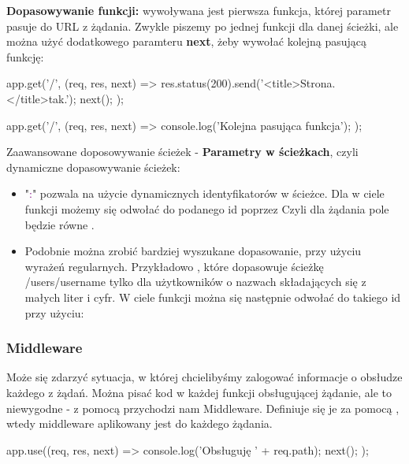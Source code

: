 \textbf{Dopasowywanie funkcji:} wywoływana jest pierwsza funkcja, której parametr pasuje do URL z żądania. Zwykle piszemy po jednej funkcji dla danej ścieżki, ale można użyć dodatkowego paramteru \textbf{next}, żeby wywołać kolejną pasującą funkcję:

\begin{js}
app.get('/', (req, res, next) => {
    res.status(200).send('<title>Strona.</title>tak.');
    next();
});

app.get('/', (req, res, next) => {
    console.log('Kolejna pasująca funkcja');
}); 
\end{js}

Zaawansowane doposowywanie ścieżek - \textbf{Parametry w ścieżkach}, czyli dynamiczne dopasowywanie ścieżek:
\begin{itemize}
    \item "\textcolor{purple}{:}" pozwala na użycie dynamicznych identyfikatorów w ścieżce. Dla 
     w ciele funkcji możemy się odwołać do podanego id poprzez  
    Czyli dla żądania  pole  będzie równe .
    
    \item Podobnie można zrobić bardziej wyszukane dopasowanie, przy użyciu wyrażeń regularnych. Przykładowo , które dopasowuje ścieżkę /users/{username} tylko dla użytkowników o nazwach składających się z małych liter i cyfr.
    W ciele funkcji można się następnie odwołać do takiego id przy użyciu: 
\end{itemize}


\subsubsection{Middleware}
Może się zdarzyć sytuacja, w której chcielibyśmy zalogować informacje o obsłudze każdego z żądań. Można pisać kod w każdej funkcji obsługującej żądanie, ale to niewygodne - z pomocą przychodzi nam Middleware. Definiuje się je za pomocą , wtedy middleware aplikowany jest do każdego żądania.

\begin{example}
\begin{js}
app.use((req, res, next) => {
    console.log('Obsługuję ' + req.path);
    next();
});
\end{js}
    
\end{example}

